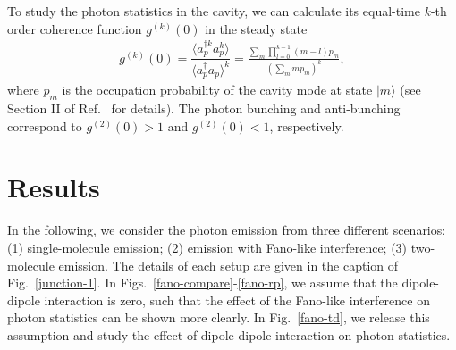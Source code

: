 \documentclass[aps,prb,
superscriptaddress,
,twocolumn
,floatfix,footinbib,longbibliography,
]{revtex4-2}
\begin{document}
To study the photon statistics in the cavity, we can calculate its equal-time $k$-th order coherence function $g^{(k)}(0)$ in the steady state
\begin{equation}
\begin{split}
g^{(k)}(0)=\dfrac{\langle a_{p}^{\dagger k} a_{p}^{k} \rangle}{\langle a_{p}^{\dagger} a_{p} \rangle^{k}}=\frac{\sum_{m}\prod_{l=0}^{k-1}(m-l)p_{m}}{(\sum_{m}mp_{m})^{k}},
\end{split}
\label{gn}
\end{equation}
where $p_{m}$ is the occupation probability of the cavity mode at state $|m\rangle$ (see Section II of Ref.~\cite{SupplementalMaterial} for details). 
The photon bunching and anti-bunching correspond to $g^{(2)}(0)>1$ and $g^{(2)}(0)<1$, respectively.


\section{Results}
In the following, we consider the photon emission from three different scenarios: (1) single-molecule emission; (2) emission with Fano-like interference; (3) two-molecule emission. The details of each setup are given in the caption of Fig.~\ref{junction-1}. In Figs.~\ref{fano-compare}-\ref{fano-rp}, we assume that the dipole-dipole interaction is zero, such that the effect of the Fano-like interference on photon statistics can be shown more clearly. In Fig.~\ref{fano-td}, we release this assumption and study the effect of dipole-dipole interaction on photon statistics. 
%
\end{document}
